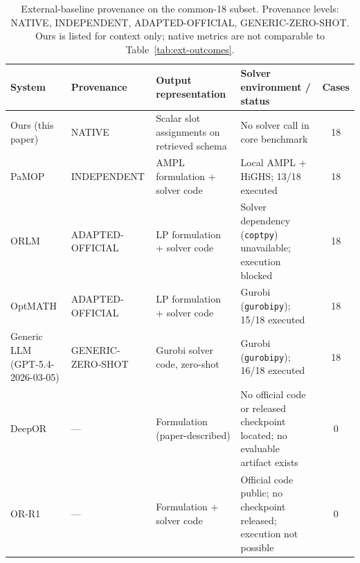\documentclass[pdflatex,sn-basic,Numbered]{sn-jnl}
\begin{document}
\begin{table}[t]
  \centering
  \caption{External-baseline provenance on the common-18 subset. Provenance levels: NATIVE, INDEPENDENT, ADAPTED-OFFICIAL, GENERIC-ZERO-SHOT. Ours is listed for context only; native metrics are not comparable to Table~\ref{tab:ext-outcomes}.}
  \label{tab:ext-context}
  \small
  \setlength{\tabcolsep}{3pt}
  \renewcommand{\arraystretch}{1.15}
  \begin{tabular}{@{}>{\raggedright\arraybackslash}p{1.9cm}>{\raggedright\arraybackslash}p{2.6cm}>{\raggedright\arraybackslash}p{2.5cm}>{\raggedright\arraybackslash}p{3.55cm}c@{}}
    \toprule
    System & Provenance & Output representation & Solver environment / status & Cases \\
    \midrule
    Ours (this paper) & NATIVE & Scalar slot assignments on retrieved schema & No solver call in core benchmark & 18 \\
    PaMOP \cite{pan2025pamop} & INDEPENDENT & AMPL formulation + solver code & Local AMPL + HiGHS; 13/18 executed & 18 \\
    ORLM \cite{huang2025orlm} & ADAPTED- OFFICIAL & LP formulation + solver code & Solver dependency (\texttt{coptpy}) unavailable; execution blocked & 18 \\
    OptMATH \cite{lu2025optmath} & ADAPTED- OFFICIAL & LP formulation + solver code & Gurobi (\texttt{gurobipy}); 15/18 executed & 18 \\
    Generic LLM (GPT-5.4- 2026-03-05) & GENERIC- ZERO-SHOT & Gurobi solver code, zero-shot & Gurobi (\texttt{gurobipy}); 16/18 executed & 18 \\
    DeepOR \cite{xiao2026deepor} & --- & Formulation (paper-described) & No official code or released checkpoint located; no evaluable artifact exists & 0 \\
    OR-R1 \cite{ding2026orr1} & --- & Formulation + solver code & Official code public; no checkpoint released; execution not possible & 0 \\
    \bottomrule
  \end{tabular}
\end{table}
\end{document}
